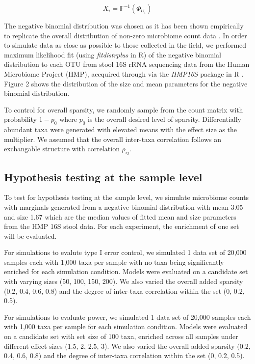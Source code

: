 \documentclass{article}
\begin{document}
$$X_i = \mathbb{F}^{-1}(\Phi_{U_i})$$

\noindent The negative binomial distribution was chosen as it has been shown empirically to replicate the overall distribution of non-zero microbiome count data \cite{kurtz2015}. In order to simulate data as close as possible to those collected in the field, we performed maximum likelihood fit (using \emph{fitdistrplus} in R) of the negative binomial distribution to each OTU from stool 16S rRNA sequencing data from the Human Microbiome Project (HMP), accquired through via the \emph{HMP16S} package in R \cite{schiffer2019}. Figure 2 shows the distribution of the size and mean parameters for the negative binomial distribution. 

\noindent To control for overall sparsity, we randomly sample from the count matrix with probability $1 - p_0$ where $p_0$ is the overall desired level of sparsity. Differentially abundant taxa were generated with elevated means with the effect size as the multiplier. We assumed that the overall inter-taxa correlation follows an exchangable structure with correlation $\rho_{ij}$.

\subsection{Hypothesis testing at the sample level}  
\noindent To test for hypothesis testing at the sample level, we simulate microbiome counts with marginals generated from a negative binomial distribution with mean 3.05 and size 1.67 which are the median values of fitted mean and size parameters from the HMP 16S stool data. For each experiment, the enrichment of one set will be evaluated. 

\noindent For simulations to evalute type I error control, we simulated 1 data set of 20,000 samples each with 1,000 taxa per sample with no taxa being significantly enriched for each simulation condition. Models were evaluated on a candidate set with varying sizes (50, 100, 150, 200). We also varied the overall added sparsity (0.2, 0.4, 0.6, 0.8) and the degree of inter-taxa correlation within the set (0, 0.2, 0.5).  

\noindent For simulations to evaluate power, we simulated 1 data set of 20,000 samples each with 1,000 taxa per sample for each simulation condition. Models were evaluated on a candidate set with set size of 100 taxa, enriched across all samples under different effect sizes (1.5, 2, 2.5, 3). We also varied the overall added sparsity (0.2, 0.4, 0.6, 0.8) and the degree of inter-taxa correlation within the set (0, 0.2, 0.5). 
\end{document}
